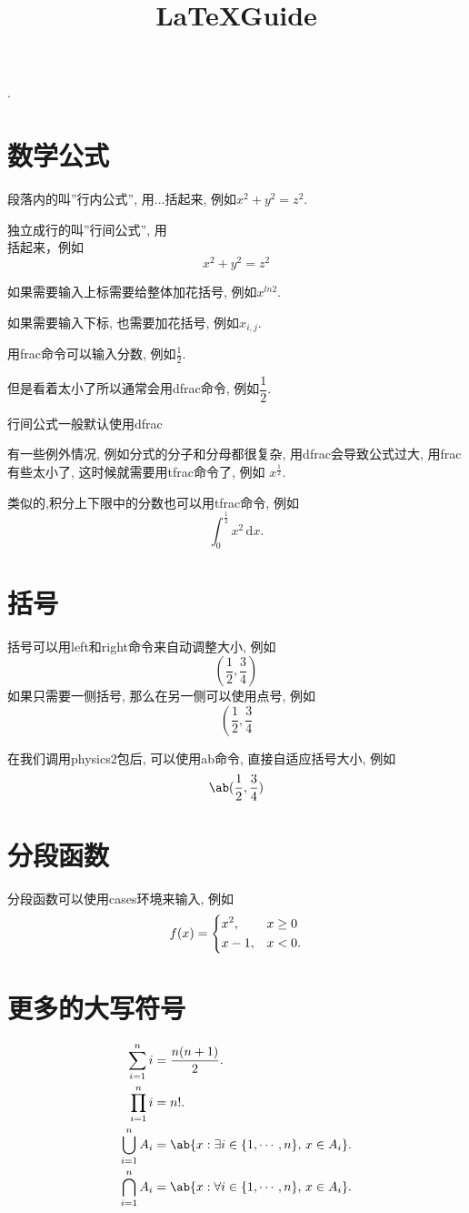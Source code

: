 \documentclass{MathNoteCN}
\title{ \LaTeX Guide}
\begin{document}
. 
\section{数学公式}
段落内的叫''行内公式'', 用$...$括起来, 例如$x^2+y^2=z^2$. 

独立成行的叫''行间公式'', 用\[\]括起来，例如
\[
x^2+y^2=z^2
\]

如果需要输入上标需要给整体加花括号, 例如$x^{ln2}$. 

如果需要输入下标, 也需要加花括号, 例如$x_{i,j}$.

用frac命令可以输入分数, 例如$\frac{1}{2}$.

但是看着太小了所以通常会用dfrac命令, 例如$\dfrac{1}{2}$.%

行间公式一般默认使用dfrac

有一些例外情况, 例如分式的分子和分母都很复杂, 用dfrac会导致公式过大, 用frac有些太小了, 这时候就需要用tfrac命令了, 例如
$x^{\tfrac{1}{2}}$. 

类似的,积分上下限中的分数也可以用tfrac命令, 例如
\[
\int_{0}^{\tfrac{1}{2}}x^2\, \mathrm{d}x.%
\]

\section{括号}
括号可以用left和right命令来自动调整大小, 例如
\[
\left( \dfrac{1}{2}, \dfrac{3}{4} \right) 
\]
如果只需要一侧括号, 那么在另一侧可以使用点号, 例如
\[
\left( \dfrac{1}{2}, \dfrac{3}{4} \right. 
\]

在我们调用physics2包后, 可以使用ab命令, 直接自适应括号大小, 例如
\[
\ab(\dfrac{1}{2}, \dfrac{3}{4})
\]

\section{分段函数}
分段函数可以使用cases环境来输入, 例如
\[
f(x) =
\begin{dcases}
    x^2, & x \ge 0 \\
    x-1, & x < 0. %
\end{dcases}
\]

\section{更多的大写符号}

\begin{align*}
\sum_{i=1}^n i &= \dfrac{n(n+1)}{2}. \\
\prod_{i=1}^n i &= n!. \\
\bigcup_{i=1}^n A_i &= \ab\{x:\exists i\in\{1,\cdots, n\}, \, x\in A_i\}. \\
\bigcap_{i=1}^n A_i &= \ab\{x:\forall i\in\{1,\cdots, n\}, \, x\in A_i\}. \\
\end{align*}
\end{document}
